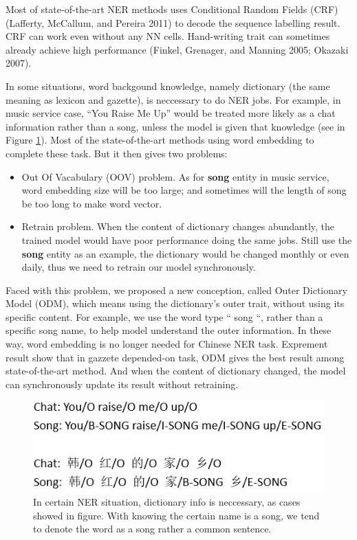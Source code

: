 \documentclass[letterpaper]{article} %
\begin{document}
Most of state-of-the-art NER methods uses Conditional Random Fields (CRF) (Lafferty, McCallum, and Pereira 2011) to decode the sequence labelling result. CRF can work even without any NN cells. Hand-writing trait can sometimes already achieve high performance (Finkel, Grenager, and Manning 2005; Okazaki 2007). 

In some situations, word backgound knowledge, namely dictionary (the same meaning as lexicon and gazette), is neccessary to do NER jobs. For example, in music service case, “You Raise Me Up'' would be treated more likely as a chat information rather than a song, unless the model is given that knowledge (see in Figure \ref{fig1}). Most of the state-of-the-art methods using word embedding to complete these task. But it then gives two problems: 

\begin{itemize}
\item Out Of Vacabulary (OOV) problem. As for \textbf{song} entity in music service, word embedding size will be too large; and sometimes will the length of song be too long to make word vector. 
\item Retrain problem. When the content of dictionary changes abundantly, the trained model would have poor performance doing the same jobs. Still use the \textbf{song} entity as an example, the dictionary would be changed monthly or even daily, thus we need to retrain our model synchronously. 
\end{itemize}

Faced with this problem, we proposed a new conception, called Outer Dictionary Model (ODM), which means using the dictionary's outer trait, without using its specific content. For example, we use the word type `` song ``, rather than a specific song name, to help model understand the outer information. In these way, word embedding is no longer needed for Chinese NER task. Exprement result show that in gazzete depended-on task, ODM gives the best result among state-of-the-art method. And when the content of dictionary changed, the model can synchronously update its result without retraining.

\begin{figure}[t]
\centering
\includegraphics[width=0.9\columnwidth]{gazzete_is_needed} %
\caption{In certain NER situation, dictionary info is neccessary, as cases showed in figure. With knowing the certain name is a song, we tend to denote the word as a song rather a common sentence.}
\label{fig1}
\end{figure}
\end{document}
